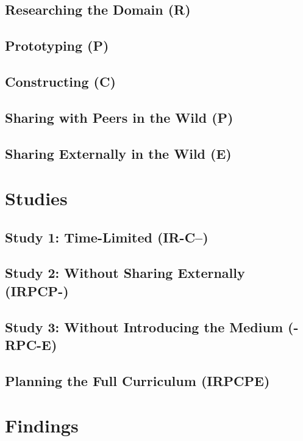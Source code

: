 \documentclass{sigchi}
\begin{document}
\subsection{Researching the Domain (R)}

\subsection{Prototyping (P)}

\subsection{Constructing (C)}

\subsection{Sharing with Peers in the Wild (P)}

\subsection{Sharing Externally in the Wild (E)}

\section{Studies}

\subsection{Study 1: Time-Limited (IR-C--)}

\subsection{Study 2: Without Sharing Externally (IRPCP-)}

\subsection{Study 3: Without Introducing the Medium (-RPC-E)}

\subsection{Planning the Full Curriculum (IRPCPE)}

\section{Findings}
\end{document}
